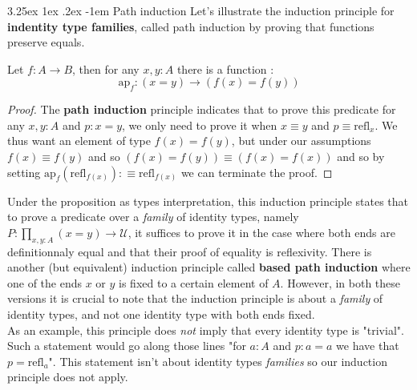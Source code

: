 \documentclass{report}
\makeatletter
\renewcommand\paragraph{\@startsection{paragraph}{5}{\z@}%
  {3.25ex \@plus1ex \@minus.2ex}%
  {-1em}%
  {\normalfont\normalsize\bfseries}}
\makeatother
\begin{document}
\paragraph{Path induction}
Let's illustrate the induction principle for \textbf{indentity type families}, called path induction by proving that functions preserve equals.
\begin{prop}
Let $f : A \rightarrow B$, then for any $x,y :A$ there is a function :
$$\mathrm{ap}_f : (x=y) \rightarrow (f(x)=f(y))$$ 
\end{prop}
\begin{proof}
The \textbf{path induction} principle indicates that to prove this predicate for any $x,y : A$ and $p : x=y$, we only need to prove it when $x\equiv y$ and $p \equiv \mathrm{refl}_x$. We thus want an element of type  $f(x) = f(y)$, but under our assumptions $f(x) \equiv f(y)$ and so $(f(x)=f(y)) \equiv (f(x)=f(x))$ and so by setting $\mathrm{ap}_f(\mathrm{refl}_{f(x)}) :\equiv \mathrm{refl}_{f(x)}$ we can terminate the proof. 
\end{proof}
Under the proposition as types interpretation, this induction principle states that to prove a predicate over a \textit{family} of identity types, namely $P : \prod_{x,y : A} (x=y) \rightarrow \mathcal{U}$, it suffices to prove it in the case where both ends are definitionnaly equal and that their proof of equality is reflexivity. There is another (but equivalent) induction principle called \textbf{based path induction} where one of the ends $x$ or $y$ is fixed to a certain element of $A$. However, in both these versions it is crucial to note that the induction principle is about a \textit{family} of identity types, and not one identity type with both ends fixed.\\
As an example, this principle does \textit{not} imply that every identity type is "trivial". Such a statement would go along those lines "for $a : A$ and $p: a=a$ we have that $p = \mathrm{refl}_a$". This statement isn't about identity types \textit{families} so our induction principle does not apply.
\end{document}
